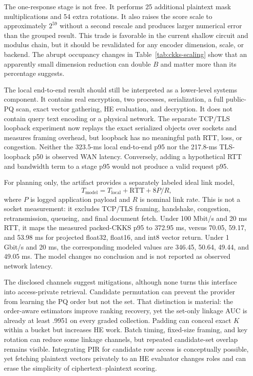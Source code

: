 \documentclass[pdflatex,sn-basic,Numbered]{sn-jnl}
\theoremstyle{plain}
\begin{document}
The one-response stage is not free. It performs 25 additional plaintext mask multiplications and 54 extra rotations. It also raises the score scale to approximately $2^{59}$ without a second rescale and produces larger numerical error than the grouped result. This trade is favorable in the current shallow circuit and modulus chain, but it should be revalidated for any encoder dimension, scale, or backend. The abrupt occupancy changes in Table~\ref{tab:ckks-scaling} show that an apparently small dimension reduction can double $B$ and matter more than its percentage suggests.

The local end-to-end result should still be interpreted as a lower-level systems component. It contains real encryption, two processes, serialization, a full public-PQ scan, exact vector gathering, HE evaluation, and decryption. It does not contain query text encoding or a physical network. The separate TCP/TLS loopback experiment now replays the exact serialized objects over sockets and measures framing overhead, but loopback has no meaningful path RTT, loss, or congestion. Neither the 323.5-ms local end-to-end p95 nor the 217.8-ms TLS-loopback p50 is observed WAN latency. Conversely, adding a hypothetical RTT and bandwidth term to a stage p95 would not produce a valid request p95.

For planning only, the artifact provides a separately labeled ideal link model,
\begin{equation}
  T_{\mathrm{model}}=T_{\mathrm{local}}+\mathrm{RTT}+8P/R,
  \label{eq:link-model}
\end{equation}
where $P$ is logged application payload and $R$ is nominal link rate. This is not a socket measurement: it excludes TCP/TLS framing, handshake, congestion, retransmission, queueing, and final document fetch. Under 100 Mbit/s and 20 ms RTT, it maps the measured packed-CKKS p95 to 372.95 ms, versus 70.05, 59.17, and 53.98 ms for projected float32, float16, and int8 vector return. Under 1 Gbit/s and 20 ms, the corresponding modeled values are 346.45, 50.64, 49.44, and 49.05 ms. The model changes no conclusion and is not reported as observed network latency.

The disclosed channels suggest mitigations, although none turns this interface into access-private retrieval. Candidate permutation can prevent the provider from learning the PQ order but not the set. That distinction is material: the order-aware estimators improve ranking recovery, yet the set-only linkage AUC is already at least .9951 on every graded collection. Padding can conceal exact $K$ within a bucket but increases HE work. Batch timing, fixed-size framing, and key rotation can reduce some linkage channels, but repeated candidate-set overlap remains visible. Integrating PIR for candidate row access is conceptually possible, yet fetching plaintext vectors privately to an HE evaluator changes roles and can erase the simplicity of ciphertext--plaintext scoring.
\end{document}
